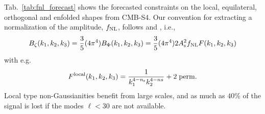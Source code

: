 
%
Tab.~\ref{tab:fnl_forecast} shows the forecasted constraints on the local, equilateral, orthogonal and enfolded shapes from CMB-S4. Our convention for extracting a normalization of the amplitude, $f_{\rm NL}$, follows \cite{Babich:2004gb} and \cite{Ade:2013ydc}, i.e., 
\begin{equation}
B_{\zeta}(k_1,k_2,k_3) = \frac{3}{5} (4 \pi^4) B_{\Phi} (k_1,k_2,k_3) = \frac{3}{5} (4 \pi^4) 2 A_{\rm s}^2 f_{\rm NL} F(k_1,k_2,k_3) 
\end{equation}
with e.g. 
\begin{equation}
F^{\rm local}(k_1,k_2,k_3) = \frac{1}{k_1^{4-n_{\rm s}}k_2^{4-ns}} + {\rm 2\;perm.}
\end{equation}
Local type non-Gaussianities benefit from large scales, and as much as $40\%$ of the signal is lost if the modes $\ell<30$ are not available. 
